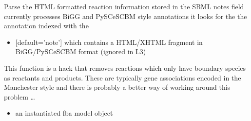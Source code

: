 \documentclass[letterpaper,10pt,english]{sphinxmanual}
\begin{document}
\begin{fulllineitems}
\label{\detokenize{modules_doc:cbmpy.CBTools.processSBMLAnnotationNotes}}
\pysigstartsignatures
{}
\pysigstopsignatures
\sphinxAtStartPar
Parse the HTML formatted reaction information stored in the SBML notes field currently
processes BiGG and PySCeSCBM style annotations it looks for the the annotation indexed
with the 
\begin{itemize}
\item {} 
\sphinxAtStartPar
{} {[}default=’note’{]} which contains a HTML/XHTML fragment in BiGG/PySCeSCBM format (ignored in L3)

\end{itemize}

\end{fulllineitems}


\begin{fulllineitems}
\label{\detokenize{modules_doc:cbmpy.CBTools.removeFixedSpeciesReactions}}
\pysigstartsignatures
{}
\pysigstopsignatures
\sphinxAtStartPar
This function is a hack that removes reactions which only have boundary species as reactants
and products. These are typically gene associations encoded in the Manchester style and there
is probably a better way of working around this problem …
\begin{itemize}
\item {} 
\sphinxAtStartPar
{} an instantiated fba model object

\end{itemize}

\end{fulllineitems}

\end{document}
